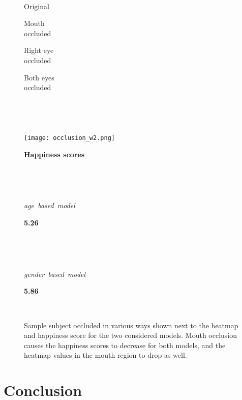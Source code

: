 \documentclass[runningheads]{llncs}
\begin{document}
\begin{figure}[!htb]
\centering \small
\parbox{1.5cm}{~}%
\parbox{2.25cm}{\centering Original}%
\parbox{2.25cm}{\centering Mouth\\occluded}%
\parbox{2.25cm}{\centering Right eye\\occluded}%
\parbox{2.25cm}{\centering Both eyes\\occluded}\\
\parbox{0.9cm}{~}%
%
%
\texttt{[image: occlusion\_w2.png]}\\
\parbox{5.5cm}{\bf Happiness scores}\parbox{7cm}{~}\\
\parbox{2.5cm}{\it age~based~model}%
\parbox{2.25cm}{}%
\parbox{2.25cm}{\centering \bf 5.26}%
\parbox{2.25cm}{}%
\parbox{2.25cm}{}%
\parbox{1cm}{~}\\
\parbox{2.5cm}{\it gender~based~model}%
\parbox{2.25cm}{}%
\parbox{2.25cm}{\centering \bf 5.86}%
\parbox{2.25cm}{}%
\parbox{2.25cm}{}%
\parbox{1cm}{~}
\caption{Sample subject occluded in various ways shown next to the heatmap and happiness score for the two considered models. Mouth occlusion causes the happiness scores to decrease for both models, and the heatmap values in the mouth region to drop as well.}
\label{fig:occlusion}
\end{figure}

\section{Conclusion}
\end{document}

